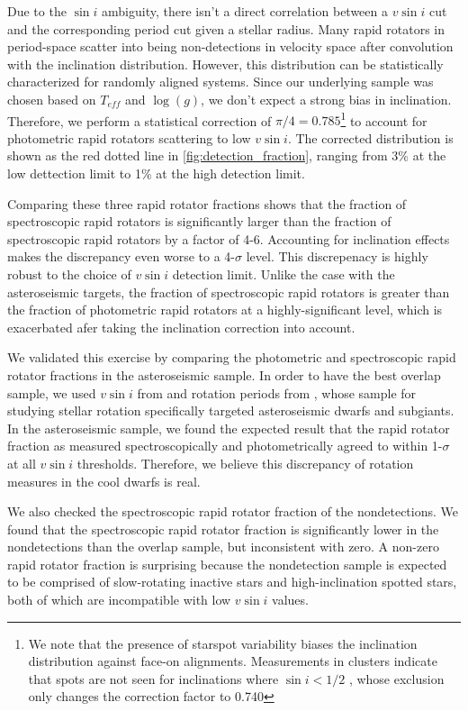 \documentclass[manuscript]{aastex6}
\newcommand{\vsini}{\ensuremath{v \sin i}}
\newcommand{\Teff}{\ensuremath{T_{eff}}}
\newcommand{\logg}{\ensuremath{\log(g)}}
\begin{document}
Due to the \(\sin i\) ambiguity, there isn't a direct correlation
between a \vsini{} cut and the corresponding period cut given a stellar radius.
Many rapid rotators in period-space scatter into being non-detections in
velocity space after convolution with the inclination distribution. However,
this distribution can be statistically characterized for randomly
aligned systems. Since our underlying sample was chosen based on
\Teff{} and \logg{}, we don't expect a strong bias in inclination.
Therefore, we perform a statistical correction of \(\pi/4=0.785\)\footnote{We 
  note that the presence of starspot variability biases the
    inclination distribution against face-on alignments. Measurements
    in clusters indicate that spots are not seen for inclinations where 
    \(\sin i < 1/2\) \citep{Jackson10}, whose exclusion only changes the 
correction factor to 0.740} 
to account for photometric rapid rotators scattering to low
\vsini{}. The  corrected distribution is shown as the red dotted line in
\cref{fig:detection_fraction}, ranging from 3\% at the low dettection
limit to 1\% at the high detection limit.

Comparing these three rapid rotator fractions shows that the fraction of
spectroscopic rapid rotators is significantly larger than the fraction
of spectroscopic rapid rotators by a factor of 4-6. Accounting for
inclination effects makes the discrepancy even worse to a 4-\(\sigma\)
level. This discrepenacy is highly robust to the choice of
\vsini{} detection limit. Unlike  
the case with the asteroseismic targets, the fraction of spectroscopic rapid
rotators is greater than the fraction of photometric rapid
rotators at a highly-significant level, which is exacerbated afer taking the
inclination correction into account.

We validated this exercise by comparing the photometric and spectroscopic
rapid rotator fractions in the asteroseismic sample. In order to have the best
overlap sample, we used \vsini{} from \citet{Bruntt12} and rotation periods
from \citet{Garcia14}, whose sample for studying stellar rotation specifically
targeted asteroseismic dwarfs and subgiants. In the asteroseismic
sample, we found the expected result that the rapid rotator
fraction as measured spectroscopically and photometrically agreed to within
1-\(\sigma\) at all \vsini{} thresholds. Therefore, we believe this
discrepancy of rotation measures in the cool dwarfs is real.

We also checked the spectroscopic rapid rotator fraction of the 
\citet{McQuillan14} nondetections. We found that the spectroscopic rapid 
rotator fraction is significantly
lower in the nondetections than the overlap sample, but inconsistent with zero. 
A non-zero rapid rotator fraction is surprising because the nondetection
sample is expected to be comprised of slow-rotating inactive stars and 
high-inclination spotted stars, both of which are incompatible with low 
\vsini{} values. 
\end{document}
